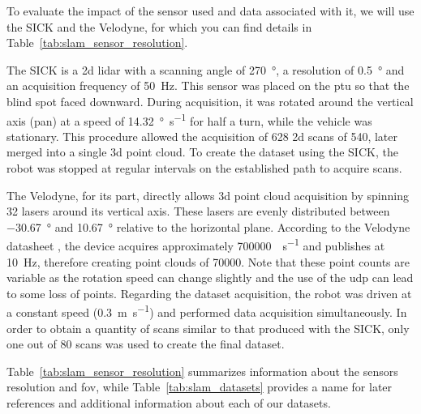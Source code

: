 To evaluate the impact of the sensor used and data associated with it, we will use the SICK and the Velodyne, for which you can find details in Table~\ref{tab:slam_sensor_resolution}.

The SICK is a \gls*{2d} \gls*{lidar} with a scanning angle of \SI{270}{\degree}, a resolution of \SI{0.5}{\degree} and an acquisition frequency of \SI{50}{\hertz}. This sensor was placed on the \gls*{ptu} so that the blind spot faced downward. During acquisition, it was rotated around the vertical axis (pan) at a speed of \SI{14.32}{\degree\per\second} for half a turn, while the vehicle was stationary. This procedure allowed the acquisition of 628 \gls*{2d} scans of \SI{540}{\points}, later merged into a single \gls*{3d} point cloud. To create the dataset using the SICK, the robot was stopped at regular intervals on the established path to acquire scans.

The Velodyne, for its part, directly allows \gls*{3d} point cloud acquisition by spinning 32 lasers around its vertical axis. These lasers are evenly distributed between \SI{-30.67}{\degree} and \SI{10.67}{\degree} relative to the horizontal plane. According to the Velodyne datasheet \citep{VelodyneDatasheet}, the device acquires approximately \SI{700000}{\points\per\second} and publishes at \SI{10}{\hertz}, therefore creating point clouds of \SI{70000}{\points}. Note that these point counts are variable as the rotation speed can change slightly and the use of the \gls*{udp} can lead to some loss of points. Regarding the dataset acquisition, the robot was driven at a constant speed (\SI{0.3}{\meter\per\second}) and performed data acquisition simultaneously. In order to obtain a quantity of scans similar to that produced with the SICK, only one out of 80 scans was used to create the final dataset.

Table~\ref{tab:slam_sensor_resolution} summarizes information about the sensors resolution and \gls*{fov}, while Table~\ref{tab:slam_datasets} provides a name for later references and additional information about each of our datasets.

